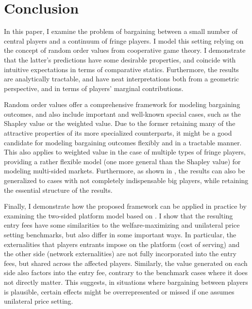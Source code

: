 \documentclass[a4paper]{article}
\begin{document}
\section{Conclusion}
\label{sec:conclusions}

In this paper, I examine the problem of bargaining between a small number of central players and a continuum of fringe players.
I model this setting relying on the concept of random order values from cooperative game theory.
I demonstrate that the latter's predictions have some desirable properties, and coincide with intuitive expectations in terms of comparative statics.
Furthermore, the results are analytically tractable, and have neat interpretations both from a geometric perspective, and in terms of players' marginal contributions.

Random order values offer a comprehensive framework for modeling bargaining outcomes, and also include important and well-known special cases, such as the Shapley value or the weighted value.
Due to the former retaining many of the attractive properties of its more specialized counterparts, it might be a good candidate for modeling bargaining outcomes flexibly and in a tractable manner.
This also applies to weighted value in the case of multiple types of fringe players, providing a rather flexible model (one more general than the Shapley value) for modeling multi-sided markets.
Furthermore, as shown in , the results can also be generalized to cases with not completely indispensable big players, while retaining the essential structure of the results.

Finally, I demonstrate how the proposed framework can be applied in practice by
examining the two-sided platform model based on \textcite{armstrong2006competition}.
I show that the resulting entry fees have some similarities to the welfare-maximizing and unilateral price setting benchmarks, but also differ in some important ways.
In particular, the externalities that players entrants impose on the platform (cost of serving) and the other side (network externalities) are not fully incorporated into the entry fees, but shared across the affected players.
Similarly, the value generated on each side also factors into the entry fee, contrary to the benchmark cases where it does not directly matter.
This suggests, in situations where bargaining between players is plausible, certain effects might be overrepresented or missed if one assumes unilateral price setting.
\end{document}
